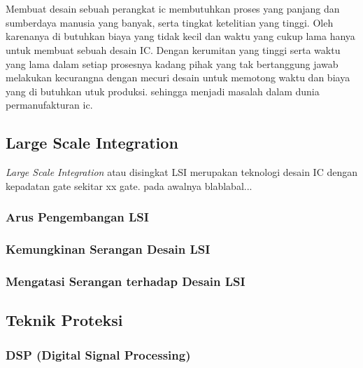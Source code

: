 \chapter{\babDua}
Membuat desain sebuah perangkat ic membutuhkan proses yang panjang dan sumberdaya manusia yang banyak, serta tingkat ketelitian yang tinggi. Oleh karenanya di butuhkan biaya yang tidak kecil dan waktu yang cukup lama hanya untuk membuat sebuah desain IC. Dengan kerumitan yang tinggi serta waktu yang lama dalam setiap prosesnya kadang pihak yang tak bertanggung jawab melakukan kecurangna dengan mecuri desain untuk memotong waktu dan biaya yang di butuhkan utuk produksi. sehingga menjadi masalah dalam dunia permanufakturan ic.

\section{Large Scale Integration}
\textit{Large Scale Integration} atau disingkat LSI merupakan teknologi desain IC dengan kepadatan gate sekitar xx gate. pada awalnya blablabal...

\subsection{Arus Pengembangan LSI}

\subsection{Kemungkinan Serangan Desain LSI}

\subsection{Mengatasi Serangan terhadap Desain LSI}

\section{Teknik Proteksi}

\subsection{DSP (Digital Signal Processing)}

